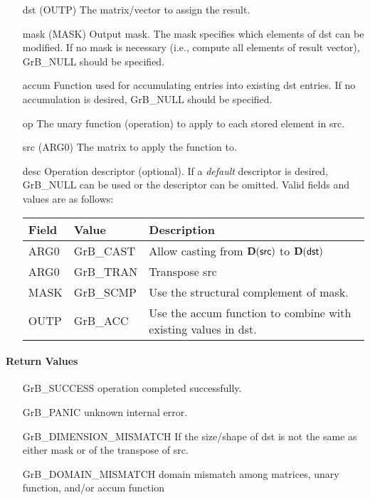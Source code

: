 \begin{itemize}[leftmargin=1.1in]
    \item[{\sf dst}]   ({\sf OUTP}) The matrix/vector to assign the result.

    \item[{\sf mask}] ({\sf MASK}) Output mask. The mask
    specifies which elements of {\sf dst} can be modified.
    If no mask is necessary (i.e., compute all elements of result
    vector), {\sf GrB\_NULL} should be specified.

    \item[{\sf accum}]  Function used for accumulating entries into existing {\sf dst} entries. 
			If no accumulation is desired, {\sf GrB\_NULL} should be specified.

    \item[{\sf op}]    The unary function (operation) to apply to each stored element in src.
    \item[{\sf src}]   ({\sf ARG0}) The matrix to apply the function to.
    \item[{\sf desc}]   Operation descriptor (optional). If a
    \emph{default} descriptor is desired, {\sf GrB\_NULL} can be
    used or the descriptor can be omitted.  Valid fields and values are as follows: \\
    \begin{tabular}{lll}
    Field  & Value & Description \\
    \hline
    {\sf ARG0} & {\sf GrB\_CAST} & Allow casting from $\bold{D}({\sf src})$ to $\bold{D}({\sf dst})$ \\
    {\sf ARG0} & {\sf GrB\_TRAN} & Transpose {\sf src} \\
    {\sf MASK} & {\sf GrB\_SCMP} & Use the structural complement of {\sf mask}. \\
    {\sf OUTP}& {\sf GrB\_ACC}  & Use the {\sf accum} function to combine with existing values in {\sf dst}.\\
    \end{tabular}
\end{itemize}

\paragraph{Return Values}


\begin{itemize}[leftmargin=2.1in]
\item[{\sf GrB\_SUCCESS}]     operation completed successfully.
\item[{\sf GrB\_PANIC}]        unknown internal error.
\item[{\sf GrB\_DIMENSION\_MISMATCH}]            
        If the size/shape of dst is not the same as either mask or
        of the transpose of src.
\item[{\sf GrB\_DOMAIN\_MISMATCH}]  
        domain mismatch among matrices, unary function, and/or
        accum function 
\end{itemize}

